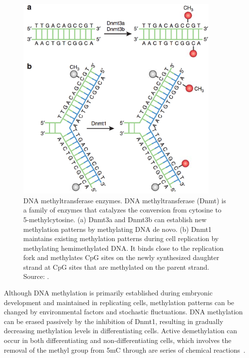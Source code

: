 \begin{figure}[htbp!]
  \begin{minipage}[c]{0.62\textwidth}
    \centering
    \includegraphics[width=0.9\textwidth]{dnmt}
  \end{minipage}
  \begin{minipage}[c]{0.36\textwidth}
    \caption[DNA methyltransferase enzymes.]{DNA methyltransferase enzymes. DNA methyltransferase (Dnmt) is a family of enzymes that catalyzes the conversion from cytosine to 5-methylcytosine. (a) Dnmt3a and Dnmt3b can establish new methylation patterns by methylating DNA de novo. (b) Dnmt1 maintains existing methylation patterns during cell replication by methylating hemimethylated DNA. It binds close to the replication fork and methylates CpG sites on the newly synthesized daughter strand at CpG sites that are methylated on the parent strand. Source: \citet{moore_dna_2013}.}
    \label{fig:intro_dnmt}
  \end{minipage}
\end{figure}

Although DNA methylation is primarily established during embryonic development and maintained in replicating cells, methylation patterns can be changed by environmental factors and stochastic fluctuations. DNA methylation can be erased passively by the inhibition of Dnmt1, resulting in gradually decreasing methylation levels in differentiating cells. Active demethylation can occur in both differentiating and non-differentiating cells, which involves the removal of the methyl group from 5mC through are series of chemical reactions~\citep{mayer_embryogenesis:_2000,zhang_active_2007}.

